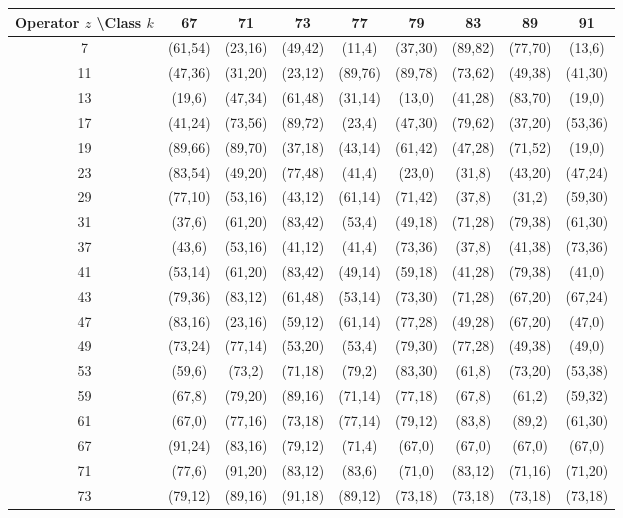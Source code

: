 \documentclass[11pt,a4paper]{article}
\begin{document}
\begin{table}[htbp]
\centering
\tiny
\begin{tabular}{c|cccccccc}
Operator \(z\) \textbackslash Class \(k\) & 67 & 71 & 73 & 77 & 79 & 83 & 89 & 91 \\
\hline
7  & (61,54) & (23,16) & (49,42) & (11,4) & (37,30) & (89,82) & (77,70) & (13,6) \\
11 & (47,36) & (31,20) & (23,12) & (89,76) & (89,78) & (73,62) & (49,38) & (41,30) \\
13 & (19,6) & (47,34) & (61,48) & (31,14) & (13,0) & (41,28) & (83,70) & (19,0) \\
17 & (41,24) & (73,56) & (89,72) & (23,4) & (47,30) & (79,62) & (37,20) & (53,36) \\
19 & (89,66) & (89,70) & (37,18) & (43,14) & (61,42) & (47,28) & (71,52) & (19,0) \\
23 & (83,54) & (49,20) & (77,48) & (41,4) & (23,0) & (31,8) & (43,20) & (47,24) \\
29 & (77,10) & (53,16) & (43,12) & (61,14) & (71,42) & (37,8) & (31,2) & (59,30) \\
31 & (37,6) & (61,20) & (83,42) & (53,4) & (49,18) & (71,28) & (79,38) & (61,30) \\
37 & (43,6) & (53,16) & (41,12) & (41,4) & (73,36) & (37,8) & (41,38) & (73,36) \\
41 & (53,14) & (61,20) & (83,42) & (49,14) & (59,18) & (41,28) & (79,38) & (41,0) \\
43 & (79,36) & (83,12) & (61,48) & (53,14) & (73,30) & (71,28) & (67,20) & (67,24) \\
47 & (83,16) & (23,16) & (59,12) & (61,14) & (77,28) & (49,28) & (67,20) & (47,0) \\
49 & (73,24) & (77,14) & (53,20) & (53,4) & (79,30) & (77,28) & (49,38) & (49,0) \\
53 & (59,6) & (73,2) & (71,18) & (79,2) & (83,30) & (61,8) & (73,20) & (53,38) \\
59 & (67,8) & (79,20) & (89,16) & (71,14) & (77,18) & (67,8) & (61,2) & (59,32) \\
61 & (67,0) & (77,16) & (73,18) & (77,14) & (79,12) & (83,8) & (89,2) & (61,30) \\
67 & (91,24) & (83,16) & (79,12) & (71,4) & (67,0) & (67,0) & (67,0) & (67,0) \\
71 & (77,6) & (91,20) & (83,12) & (83,6) & (71,0) & (83,12) & (71,16) & (71,20) \\
73 & (79,12) & (89,16) & (91,18) & (89,12) & (73,18) & (73,18) & (73,18) & (73,18) \\

\end{tabular}
\end{table}
\end{document}
